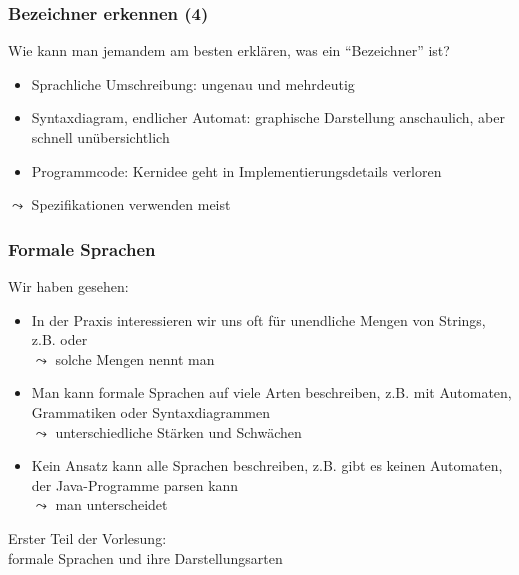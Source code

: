\documentclass[onlymath]{beamer}
\begin{document}
\begin{frame}\frametitle{Bezeichner erkennen (4)}

Wie kann man jemandem am besten erklären, was ein "`Bezeichner"' ist?
\begin{itemize}
\item \alert{Sprachliche Umschreibung}: ungenau und mehrdeutig
\item \alert{Syntaxdiagram}, \alert{endlicher Automat}: graphische Darstellung anschaulich, aber schnell unübersichtlich
\item \alert{Programmcode}: Kernidee geht in Implementierungsdetails verloren
\end{itemize}
\pause
$\leadsto$ Spezifikationen verwenden meist 


\end{frame}

\begin{frame}\frametitle{Formale Sprachen}

Wir haben gesehen:
\begin{itemize}
\item In der Praxis interessieren wir uns oft für unendliche Mengen von Strings, z.B.  oder \\
$\leadsto$ solche Mengen nennt man 
\item Man kann formale Sprachen auf viele Arten beschreiben, z.B. mit Automaten, Grammatiken oder Syntaxdiagrammen\\
$\leadsto$ unterschiedliche Stärken und Schwächen
\item Kein Ansatz kann alle Sprachen beschreiben, z.B. gibt es keinen Automaten, der Java-Programme parsen kann\\
$\leadsto$ man unterscheidet 
\end{itemize}

Erster Teil der Vorlesung:\\
formale Sprachen und ihre Darstellungsarten

\end{frame}
\end{document}
